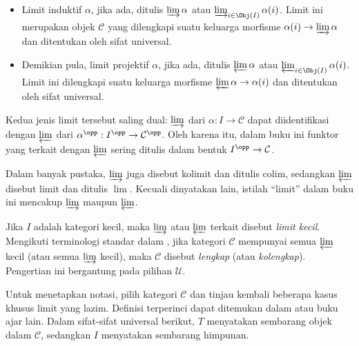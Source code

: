 \begin{itemize}
	\item Limit induktif $\alpha$, jika ada, ditulis $\varinjlim \alpha$ atau
	$\varinjlim_{i \in \Obj(I)} \alpha(i)$. Limit ini merupakan objek
	$\mathcal{C}$ yang dilengkapi suatu keluarga morfisme
	$\alpha(i) \to \varinjlim \alpha$ dan ditentukan oleh sifat universal.
	\item Demikian pula, limit projektif $\alpha$, jika ada, ditulis
	$\varprojlim \alpha$ atau $\varprojlim_{i \in \Obj(I)} \alpha(i)$. Limit
	ini dilengkapi suatu keluarga morfisme $\varprojlim \alpha \to \alpha(i)$
	dan ditentukan oleh sifat universal.
\end{itemize}

Kedua jenis limit tersebut saling dual: $\varinjlim$ dari
$\alpha: I \to \mathcal{C}$ dapat diidentifikasi dengan $\varprojlim$ dari
$\alpha^{\opp}: I^{\opp} \to \mathcal{C}^{\opp}$.
Oleh karena itu, dalam buku ini funktor yang terkait dengan $\varprojlim$
sering ditulis dalam bentuk $I^{\opp} \to \mathcal{C}$.

Dalam banyak pustaka, $\varinjlim$ juga disebut kolimit dan ditulis
$\mathrm{colim}$, sedangkan $\varprojlim$ disebut limit dan ditulis $\lim$.
Kecuali dinyatakan lain, istilah ``limit'' dalam buku ini mencakup
$\varinjlim$ maupun $\varprojlim$.

Jika $I$ adalah kategori kecil, maka $\varinjlim$ atau $\varprojlim$ terkait disebut
\emph{limit kecil}. Mengikuti terminologi standar
dalam \cite[\S~2.8]{Li1}, jika kategori $\mathcal{C}$ mempunyai semua
$\varprojlim$ kecil (atau semua $\varinjlim$ kecil), maka $\mathcal{C}$
disebut \emph{lengkap} (atau \emph{kolengkap}). Pengertian ini bergantung pada
pilihan $\mathcal{U}$.

Untuk menetapkan notasi, pilih kategori $\mathcal{C}$ dan
tinjau kembali beberapa kasus khusus limit yang lazim. Definisi terperinci
dapat ditemukan dalam \cite[\S~2.7]{Li1} atau buku ajar lain. Dalam
sifat-sifat universal berikut, $T$ menyatakan sembarang objek dalam
$\mathcal{C}$, sedangkan $I$ menyatakan sembarang himpunan.

